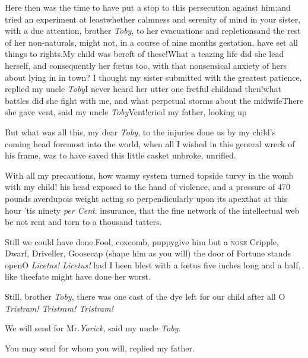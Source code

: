 \documentclass{article}
\begin{document}
Here then was the time to have put a stop to this
persecution against him;\tsh and tried an experiment at
least\tsk whether calmness and serenity of mind in your
sister, with a due attention, brother \textit{Toby}, to her
evacuations and repletions\tsk and the rest of her
non-naturals, might not,\break 
in a course of nine months gestation,\break
have set all things to rights.\tsk My child was
bereft of these!\tsk What a teazing life did she lead
herself, and consequently her fœtus too, with that
nonsensical\break
anxiety of hers about lying in in town?\break
I thought my sister submitted with the greatest patience,
replied my uncle \textit{Toby}\break\tsk I never heard her
utter one fretful
child\tsk and then!\@ what battles did she
fight with me, and what perpetual storms
about the midwife\tsk There she gave vent, said my uncle
\textit{Toby}\tsk Vent!\@ cried my father, looking up\tsk

But what was all this, my dear \textit{Toby}, to the
injuries done us by my child’s coming head foremost into the
world, when all I wished in this general wreck of his
frame, was to have saved this little casket unbroke,
unrifled.\tsk

With all my precautions, how was\break my system turned
topside turvy in the womb with my child! his head exposed to
the hand of violence, and a pressure of 470 pounds
averdupois weight acting so perpendicularly upon its
apex\tsk that at this hour ’tis ninety \textit{per Cent}.
insurance, that the fine network of the intellectual web be
not rent and torn to a thousand\break
tatters.

\tsk Still we could have done.\tsh Fool,\break 
coxcomb, puppy\tsk give him but a \textsc{nose}\break
\tsh Cripple, Dwarf, Driveller, Goosecap\break
\tsh (shape him as you will) the door of Fortune stands
open\tsk O \textit{Licetus! Licetus!} had I been blest with
a fœtus five inches long and a half, like thee\tsk fate
might have done her worst.

Still, brother \textit{Toby}, there was one cast of the dye
left for our child after all\tsk\break
O \textit{Tristram! Tristram!  Tristram!}

We will send for Mr.\@ \textit{Yorick}, said my uncle \textit{Toby}.

\tsh You may send for whom you will, replied my father.
\end{document}
